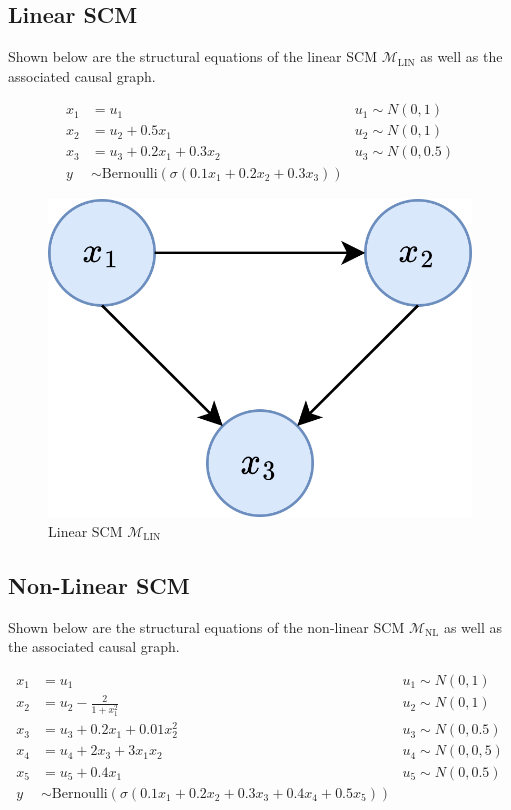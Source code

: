 \subsection{Linear SCM}

Shown below are the structural equations of the linear SCM $\mathcal{M}_{\text{LIN}}$ as well as the associated causal graph.

\begin{align}
	x_1 & = u_1 & u_1 \sim N(0,1) \\ \nonumber
	x_2 & = u_2 + 0.5x_1 & u_2 \sim N(0,1) \\ \nonumber
	x_3 & = u_3 + 0.2x_1 + 0.3x_2 & u_3 \sim N(0,0.5) \\ \nonumber
	y   & \sim \text{Bernoulli}(\sigma(0.1x_1 + 0.2x_2 + 0.3x_3))
\end{align}

\begin{figure}[!htb]
	\centering
	\includegraphics[width=0.4\linewidth]{images/draw.io/toy_scm.png}
	\caption{Linear SCM $\mathcal{M}_{\text{LIN}}$}
	\label{fig:simple_scm}
\end{figure}

\subsection{Non-Linear SCM}

Shown below are the structural equations of the non-linear SCM $\mathcal{M}_{\text{NL}}$ as well as the associated causal graph.

\begin{align}
	x_1 & = u_1 & u_1 \sim N(0,1) \\ \nonumber
	x_2 & = u_2 - \frac{2}{1 + x_1^2} & u_2 \sim N(0,1) \\ \nonumber
	x_3 & = u_3 + 0.2x_1 + 0.01x^2_2 & u_3 \sim N(0,0.5) \\ \nonumber
	x_4 & = u_4 + 2x_3 + 3x_1x_2 & u_4 \sim N(0,0,5) \\ \nonumber
	x_5 & = u_5 + 0.4x_1 & u_5 \sim N(0,0.5) \\ \nonumber
	y   & \sim \text{Bernoulli}(\sigma(0.1x_1 + 0.2x_2 + 0.3x_3 + 0.4x_4 + 0.5x_5))
\end{align}

